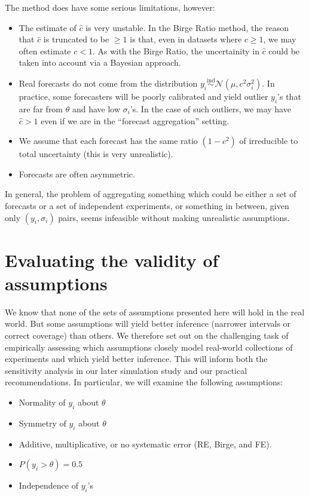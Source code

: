 \documentclass[letterpaper,12pt]{article}
\begin{document}
The method does have some serious limitations, however:
\begin{itemize}
  \item The estimate of $\hat c$ is very unstable. In the Birge Ratio method, the reason that $\hat c$ is truncated to be $\geq1$ is that, even in datasets where $c\geq 1$, we may often estimate $c<1$. As with the Birge Ratio, the uncertainity in $\hat c$ could be taken into account via a Bayesian approach.
  \item Real forecasts do not come from the distribution $y_i\overset{\mathrm{ind}}{\sim}\mathcal{N}(\mu,c^2\sigma_i^2)$. In practice, some forecasters will be poorly calibrated and yield outlier $y_i$'s that are far from $\theta$ and have low $\sigma_i$'s. In the case of such outliers, we may have $\hat c>1$ even if we are in the ``forecast aggregation'' setting.
  \item We assume that each forecast has the same ratio $(1-c^2)$ of irreducible to total uncertainty (this is very unrealistic).
  \item Forecasts are often asymmetric.
\end{itemize}

In general, the problem of aggregating something which could be either a set of forecasts or a set of independent experiments, or something in between, given only $(y_i,\sigma_i)$ pairs, seems infeasible without making unrealistic assumptions.

\section{Evaluating the validity of assumptions}\label{sec:assumptions}

We know that none of the sets of assumptions presented here will hold in the real world. But some assumptions will yield better inference (narrower intervals or correct coverage) than others. We therefore set out on the challenging task of empirically assessing which assumptions closely model real-world collections of experiments and which yield better inference. This will inform both the sensitivity analysis in our later simulation study and our practical recommendations. In particular, we will examine the following assumptions:

\begin{itemize}

\item
  Normality of $y_i$ about $\theta$
\item
  Symmetry of $y_i$ about $\theta$
\item
  Additive, multiplicative, or no systematic error (RE, Birge, and FE).
\item
  $P(y_i>\theta)=0.5$
\item
  Independence of $y_i$'s
\end{itemize}
\end{document}
